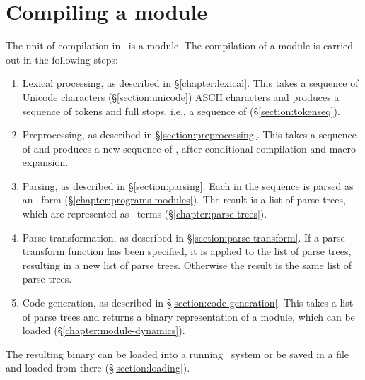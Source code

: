 %
%
%
%
%
%
%

\chapter{Compiling a module}

\label{chapter:compilation}
The unit of compilation in \Erlang\ is a module.
The compilation of a module is carried out in the following steps:
\begin{enumerate}
\item Lexical processing, as described in \S\ref{chapter:lexical}.
This takes a sequence of
\ifNew Unicode characters (\S\ref{section:unicode}) \fi
\ifOld ASCII characters \fi
and produces a sequence
of tokens and full stops, i.e., a sequence of 
(\S\ref{section:tokenseq}).
\item Preprocessing, as described in \S\ref{section:preprocessing}.
This takes a sequence of  and produces a new
sequence of , after conditional compilation
and macro expansion.
\item Parsing, as described in \S\ref{section:parsing}.
Each  in the sequence is parsed as an
\Erlang\ form (\S\ref{chapter:programs-modules}).
The result is a list of parse trees, which are represented as
\Erlang\ terms
(\S\ref{chapter:parse-trees}).
\item Parse transformation, as described in \S\ref{section:parse-transform}.
If a parse transform function has been specified, it is applied
to the list of parse trees,
resulting in a new list of parse trees.  Otherwise the result is the
same list of parse trees.
\item Code generation, as described in \S\ref{section:code-generation}.
This takes a list of parse trees and returns a binary representation
of a module, which can be loaded (\S\ref{chapter:module-dynamics}).
\end{enumerate}
The resulting binary can be loaded into a running \Erlang\ system or be saved in a
file and loaded from there (\S\ref{section:loading}).

